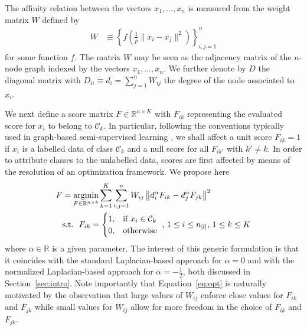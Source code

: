 \documentclass[twoside,11pt]{article}
\def\RR{\mathbb{R}}
\DeclareMathOperator{\argmin}{{\rm argmin}}
\begin{document}
The affinity relation between the vectors $x_1,\ldots,x_n$ is measured from the weight matrix $W$ defined by 
\begin{align*}
	W &\equiv \left\{ f\left( \frac1p\|x_i-x_j\|^2 \right) \right\}_{i,j=1}^n
\end{align*}
for some function $f$. The matrix $W$ may be seen as the adjacency matrix of the $n$-node graph indexed by the vectors $x_1,\ldots,x_n$. We further denote by $D$ the diagonal matrix with $D_{ii}\equiv d_{i}=\sum_{j=1}^{n}W_{ij}$ the degree of the node associated to $x_{i}$. 

We next define a score matrix $F\in\mathbb{R}^{n\times K}$ with $F_{ik}$ representing the evaluated score for $x_{i}$ to belong to ${\mathcal C}_{k}$. In particular, following the conventions typically used in graph-based semi-supervised learning \citep{chapelle2006ssl}, we shall affect a unit score $F_{ik}=1$ if $x_i$ is a labelled data of class $\mathcal C_k$ and a null score for all $F_{ik'}$ with $k'\neq k$. In order to attribute classes to the unlabelled data, scores are first affected by means of the resolution of an optimization framework. We propose here
\begin{align}
	\label{eq:opt}
	F &= \argmin_{F\in\RR^{n\times k}} \sum_{k=1}^K \sum_{i,j=1}^n W_{ij} \left\| d_i^\alpha F_{ik} - d_j^\alpha F_{jk} \right\|^2 \nonumber \\
	&\text{s.t.}~ ~ F_{ik}=\begin{cases}
1,& \text{if}\ x_{i}\in\mathcal{C}_{k}\\
0,& \text{otherwise}\
\end{cases},\thinspace1\leq i\leq n_{[l]},\thinspace1\leq k\leq K
\end{align}
where $\alpha\in\RR$ is a given parameter. The interest of this generic formulation is that it coincides with the standard Laplacian-based approach for $\alpha=0$ and with the normalized Laplacian-based approach for $\alpha=-\frac12$, both discussed in Section~\ref{sec:intro}. Note importantly that Equation~\eqref{eq:opt} is naturally motivated by the observation that large values of $W_{ij}$ enforce close values for $F_{ik}$ and $F_{jk}$ while small values for $W_{ij}$ allow for more freedom in the choice of $F_{ik}$ and $F_{jk}$.
\end{document}
